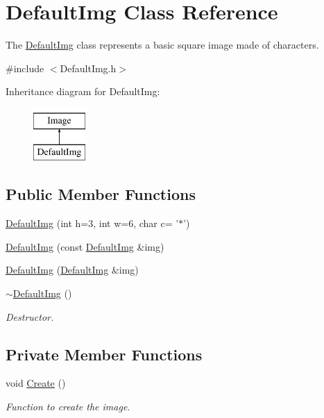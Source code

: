 \hypertarget{classDefaultImg}{\section{Default\-Img Class Reference}
\label{classDefaultImg}
}


The \hyperlink{classDefaultImg}{Default\-Img} class represents a basic square image made of characters.  




{\ttfamily \#include $<$Default\-Img.\-h$>$}

Inheritance diagram for Default\-Img\-:\begin{figure}[H]
\begin{center}
\leavevmode
\includegraphics[height=2.000000cm]{classDefaultImg}
\end{center}
\end{figure}
\subsection*{Public Member Functions}
\begin{DoxyCompactItemize}
\item 
\hyperlink{classDefaultImg_a65e225ae4d43ce46b6661cb88dc5a9dc}{Default\-Img} (int h=3, int w=6, char c= '$\ast$')
\item 
\hyperlink{classDefaultImg_a98d6ecfaa4c02eba7b2c58ad0285521e}{Default\-Img} (const \hyperlink{classDefaultImg}{Default\-Img} \&img)
\item 
\hyperlink{classDefaultImg_ad4763b2a674e202d3ea99ceb179bad6a}{Default\-Img} (\hyperlink{classDefaultImg}{Default\-Img} \&img)
\item 
\hyperlink{classDefaultImg_ad3b823ee6222b08a4999802a0dc5ceec}{$\sim$\-Default\-Img} ()
\begin{DoxyCompactList}\small\item\em Destructor. \end{DoxyCompactList}\end{DoxyCompactItemize}
\subsection*{Private Member Functions}
\begin{DoxyCompactItemize}
\item 
void \hyperlink{classDefaultImg_a9ab21b397e0d23831b2944b651058b89}{Create} ()
\begin{DoxyCompactList}\small\item\em Function to create the image. \end{DoxyCompactList}\end{DoxyCompactItemize}

